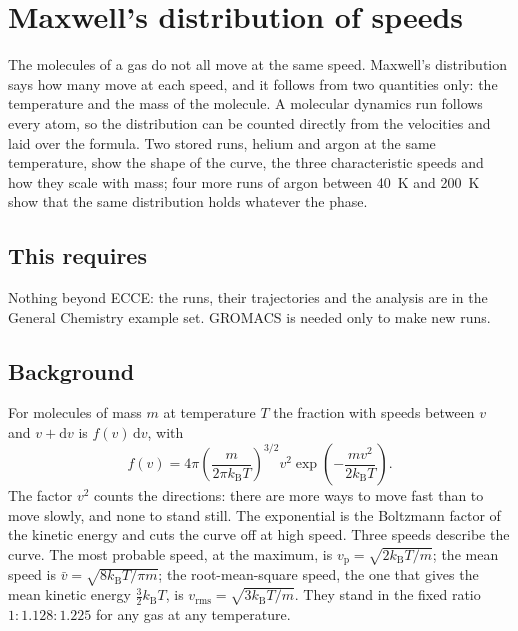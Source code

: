 \chapter{Maxwell's distribution of speeds}
\label{ch:t-maxwell}

The molecules of a gas do not all move at the same speed. Maxwell's distribution says how many move at each speed, and it follows from two quantities only: the temperature and the mass of the molecule. A molecular dynamics run follows every atom, so the distribution can be counted directly from the velocities and laid over the formula. Two stored runs, helium and argon at the same temperature, show the shape of the curve, the three characteristic speeds and how they scale with mass; four more runs of argon between \SI{40}{K} and \SI{200}{K} show that the same distribution holds whatever the phase.

\section*{This requires}
Nothing beyond ECCE: the runs, their trajectories and the analysis are in the General Chemistry example set. GROMACS is needed only to make new runs.

\section{Background}
For molecules of mass $m$ at temperature $T$ the fraction with speeds between $v$ and $v+\mathrm{d}v$ is $f(v)\,\mathrm{d}v$, with
\begin{equation}
	f(v) = 4\pi \left(\frac{m}{2\pi k_\mathrm{B}T}\right)^{3/2} v^2 \exp\!\left(-\frac{mv^2}{2k_\mathrm{B}T}\right).
\end{equation}
The factor $v^2$ counts the directions: there are more ways to move fast than to move slowly, and none to stand still. The exponential is the Boltzmann factor of the kinetic energy and cuts the curve off at high speed. Three speeds describe the curve. The most probable speed, at the maximum, is $v_\mathrm{p} = \sqrt{2k_\mathrm{B}T/m}$; the mean speed is $\bar v = \sqrt{8k_\mathrm{B}T/\pi m}$; the root-mean-square speed, the one that gives the mean kinetic energy $\tfrac{3}{2}k_\mathrm{B}T$, is $v_\mathrm{rms} = \sqrt{3k_\mathrm{B}T/m}$. They stand in the fixed ratio $1 : 1.128 : 1.225$ for any gas at any temperature.

